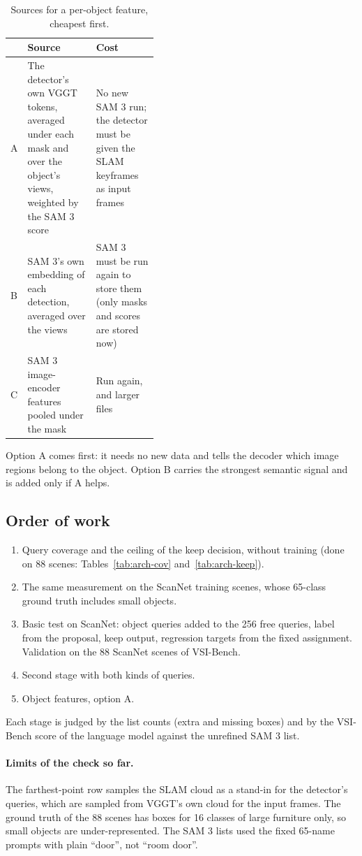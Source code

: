 \begin{table}[t]
\centering
\caption{Sources for a per-object feature, cheapest first.}
\label{tab:arch-feat}
\begin{tabular}{llp{0.42\linewidth}}
\toprule
 & Source & Cost \\
\midrule
A & The detector's own VGGT tokens, averaged under each mask and over the object's views, weighted by the
    SAM 3 score & No new SAM 3 run; the detector must be given the SLAM keyframes as input frames \\
B & SAM 3's own embedding of each detection, averaged over the views & SAM 3 must be run again to store them
    (only masks and scores are stored now) \\
C & SAM 3 image-encoder features pooled under the mask & Run again, and larger files \\
\bottomrule
\end{tabular}
\end{table}

Option A comes first: it needs no new data and tells the decoder which image regions belong to the object.
Option B carries the strongest semantic signal and is added only if A helps.

\subsection{Order of work}

\begin{enumerate}
\item Query coverage and the ceiling of the keep decision, without training
      (done on 88 scenes: Tables~\ref{tab:arch-cov} and~\ref{tab:arch-keep}).
\item The same measurement on the ScanNet training scenes, whose 65-class ground truth includes small objects.
\item Basic test on ScanNet: object queries added to the 256 free queries, label from the proposal, keep output,
      regression targets from the fixed assignment. Validation on the 88 ScanNet scenes of VSI-Bench.
\item Second stage with both kinds of queries.
\item Object features, option A.
\end{enumerate}
Each stage is judged by the list counts (extra and missing boxes) and by the VSI-Bench score of the language
model against the unrefined SAM 3 list.

\paragraph{Limits of the check so far.}
The farthest-point row samples the SLAM cloud as a stand-in for the detector's queries, which are sampled from
VGGT's own cloud for the input frames. The ground truth of the 88 scenes has boxes for 16 classes of large
furniture only, so small objects are under-represented. The SAM 3 lists used the fixed 65-name prompts with
plain ``door'', not ``room door''.
